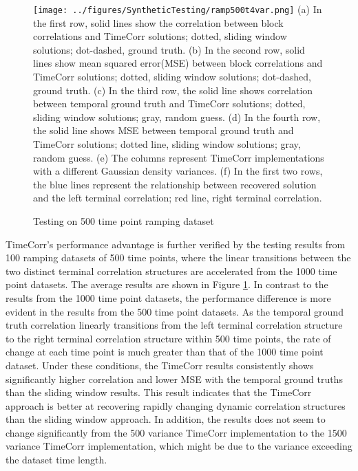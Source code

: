 \documentclass[11pt]{article}
\begin{document}
\begin{figure}[!htb]
\caption{Testing on 500 time point ramping dataset}
\texttt{[image: ../figures/SyntheticTesting/ramp500t4var.png]}
\label{fig:ramp500t4var}
(a) In the first row, solid lines show the correlation between block correlations and TimeCorr solutions; dotted, sliding window solutions; dot-dashed, ground truth. (b) In the second row, solid lines show mean squared error(MSE) between block correlations and TimeCorr solutions; dotted, sliding window solutions; dot-dashed, ground truth. (c) In the third row, the solid line shows correlation between temporal ground truth and TimeCorr solutions; dotted, sliding window solutions; gray, random guess. (d) In the fourth row, the solid line shows MSE between temporal ground truth and TimeCorr solutions; dotted line, sliding window solutions; gray, random guess. (e) The columns represent TimeCorr implementations with a different Gaussian density variances. (f) In the first two rows, the blue lines represent the relationship between recovered solution and the left terminal correlation; red line, right terminal correlation.
\end{figure}

TimeCorr's performance advantage is further verified by the testing results from 100 ramping datasets of 500 time points, where the linear transitions between the two distinct terminal correlation structures are accelerated from the 1000 time point datasets. The average results are shown in Figure \ref{fig:ramp500t4var}. In contrast to the results from the 1000 time point datasets, the performance difference is more evident in the results from the 500 time point datasets. As the temporal ground truth correlation linearly transitions from the left terminal correlation structure to the right terminal correlation structure within 500 time points, the rate of change at each time point is much greater than that of the 1000 time point dataset. Under these conditions, the TimeCorr results consistently shows significantly higher correlation and lower MSE with the temporal ground truths than the sliding window results. This result indicates that the TimeCorr approach is better at recovering rapidly changing dynamic correlation structures than the sliding window approach. In addition, the results does not seem to change significantly from the 500 variance TimeCorr implementation to the 1500 variance TimeCorr implementation, which might be due to the variance exceeding the dataset time length.
\end{document}
